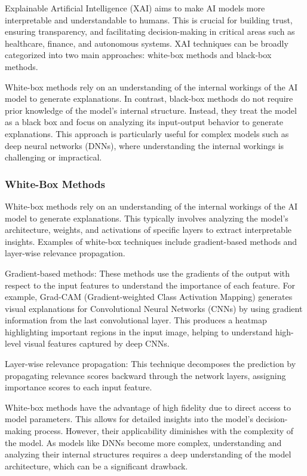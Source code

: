 \documentclass{article}
\begin{document}
Explainable Artificial Intelligence (XAI) aims to make AI models more interpretable and understandable to humans. This is crucial for building trust, ensuring transparency, and facilitating decision-making in critical areas such as healthcare, finance, and autonomous systems. XAI techniques can be broadly categorized into two main approaches: white-box methods and black-box methods.

White-box methods rely on an understanding of the internal workings of the AI model to generate explanations. In contrast, black-box methods do not require prior knowledge of the model’s internal structure. Instead, they treat the model as a black box and focus on analyzing its input-output behavior to generate explanations. This approach is particularly useful for complex models such as deep neural networks (DNNs), where understanding the internal workings is challenging or impractical.

\subsubsection{White-Box Methods}
White-box methods rely on an understanding of the internal workings of the AI model to generate explanations. This typically involves analyzing the model’s architecture, weights, and activations of specific layers to extract interpretable insights. Examples of white-box techniques include gradient-based methods and layer-wise relevance propagation.

Gradient-based methods: These methods use the gradients of the output with respect to the input features to understand the importance of each feature. For example, Grad-CAM (Gradient-weighted Class Activation Mapping) generates visual explanations for Convolutional Neural Networks (CNNs) by using gradient information from the last convolutional layer. This produces a heatmap highlighting important regions in the input image, helping to understand high-level visual features captured by deep CNNs.

Layer-wise relevance propagation: This technique decomposes the prediction by propagating relevance scores backward through the network layers, assigning importance scores to each input feature.

White-box methods have the advantage of high fidelity due to direct access to model parameters. This allows for detailed insights into the model’s decision-making process. However, their applicability diminishes with the complexity of the model. As models like DNNs become more complex, understanding and analyzing their internal structures requires a deep understanding of the model architecture, which can be a significant drawback.
\end{document}
